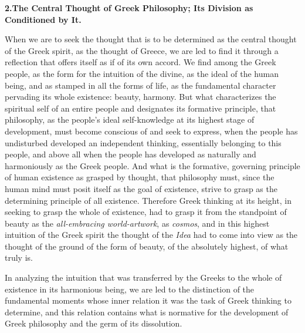 \divrule

\begin{center}
\textbf{2.\enspace The Central Thought of Greek Philosophy; Its Division as\\
Conditioned by It.}
\end{center}

When we are to seek the thought that is to be determined as the central
thought of the Greek spirit, as the thought of Greece, we are led to find it
through a reflection that offers itself as if of its own accord. We find among
the Greek people, as the form for the intuition of the divine, as the ideal of
the human being, and as stamped in all the forms of life, as the fundamental
character pervading its whole existence: beauty, harmony. But what
characterizes the spiritual self of an entire people and designates its
formative principle, that philosophy, as the people's ideal self-knowledge at
its highest stage of development, must become conscious of and seek to
express, when the people has undisturbed developed an independent thinking,
essentially belonging to this people, and above all when the people has
developed as naturally and harmoniously as
the Greek people. And what is the formative, governing principle of human
existence as grasped by thought, that philosophy must, since the human mind
must posit itself as the goal of existence, strive to grasp as the determining
principle of all existence. Therefore Greek thinking at its height, in seeking
to grasp the whole of existence, had to grasp it from the standpoint of beauty
as the \emph{all-embracing world-artwork}, as \emph{cosmos}, and in this
highest intuition of the Greek spirit the thought of the \emph{Idea} had to
come into view as the thought of the ground of the form of beauty, of the
absolutely highest, of what truly is.

In analyzing the intuition that was transferred by the Greeks to the whole of
existence in its harmonious being, we are led to the distinction of
the fundamental moments whose inner relation it was the task of Greek thinking
to determine, and this relation contains what is normative for the
development of Greek philosophy and the germ of its dissolution.

